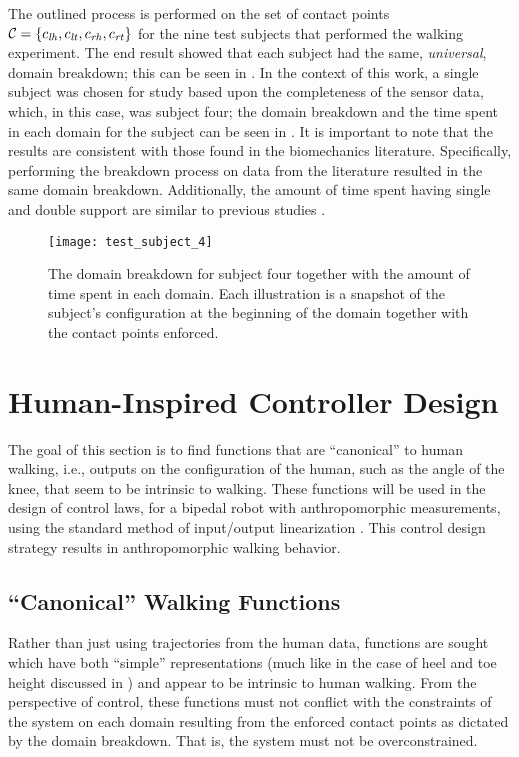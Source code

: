 The outlined process is performed on the set of contact points $\mathcal{C} =  \{c_{\mathit{lh}},
c_{\mathit{lt}}, c_{\mathit{rh}} , c_{\mathit{rt}}\}$ for the nine test subjects that performed the walking
experiment.
%
The end result showed that each subject had the same, {\em universal}, domain
breakdown; this can be seen in .
%
In the context of this work, a single subject was chosen for study based upon
the completeness of the sensor data, which, in this case, was subject four; the
domain breakdown and the time spent in each domain for the subject can be seen
in .
%
It is important to note that the results are consistent with those found in the biomechanics
literature.
%
Specifically, performing the breakdown process on data from the literature
\cite{Winter2009} resulted in the same domain breakdown.
%
Additionally, the amount of time spent having single and double support are
similar to previous studies \cite{Ackermann2007}.

\begin{figure}[t]
  \centering
  \texttt{[image: test\_subject\_4]}
  \caption{The domain breakdown for subject four together with the amount of
    time spent in each domain.
    Each illustration is a snapshot of the subject's configuration at the
    beginning of the domain together with the contact points enforced.}
  \label{fred}
\end{figure}


\section{Human-Inspired Controller Design}

The goal of this section is to find functions that are ``canonical'' to human
walking, i.e., outputs on the configuration of the human, such as the angle of
the knee, that seem to be intrinsic to walking.
%
These functions will be used in the design of control laws, for a bipedal robot
with anthropomorphic measurements, using the standard method of input/output
linearization \cite{Sastry1999}.
%
This control design strategy results in anthropomorphic walking behavior.


\subsection{``Canonical'' Walking Functions} \label{sec:functions}

Rather than just using trajectories from the human data, functions are sought
which have both ``simple'' representations (much like in the case of heel and
toe height discussed in ) and appear to be intrinsic
to human walking.
%
From the perspective of control, these functions must not conflict with the
constraints of the system on each domain resulting from the enforced contact
points as dictated by the domain breakdown.
%
That is, the system must not be overconstrained.

